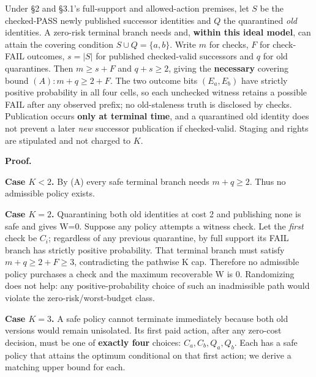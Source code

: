 \documentclass[
  10pt,
  american,
  a4paper,
]{article}
\begin{document}
Under §2 and §3.1's full-support and allowed-action premises, let \(S\)
be the checked-PASS newly published successor identities and \(Q\) the
quarantined \emph{old} identities. A zero-risk terminal branch needs
and, \textbf{within this ideal model}, can attain the covering condition
\(S\cup Q=\{a,b\}\). Write \(m\) for checks, \(F\) for check-FAIL
outcomes, \(s=|S|\) for published checked-valid successors and \(q\) for
old quarantines. Then \(m\ge s+F\) and \(q+s\ge2\), giving the
\textbf{necessary} covering bound \((A): m+q\ge2+F\). The two outcome
bits \((E_a,E_b)\) have strictly positive probability in all four cells,
so each unchecked witness retains a possible FAIL after any observed
prefix; no old-staleness truth is disclosed by checks. Publication
occurs \textbf{only at terminal time}, and a quarantined old identity
does not prevent a later \emph{new} successor publication if
checked-valid. Staging and rights are stipulated and not charged to
\(K\).

\textbf{Proof.}

\textbf{Case \(K<2\).} By (A) every safe terminal branch needs
\(m+q\ge2\). Thus no admissible policy exists.

\textbf{Case \(K=2\).} Quarantining both old identities at cost 2 and
publishing none is safe and gives W=0. Suppose any policy attempts a
witness check. Let the \emph{first} check be \(C_i\); regardless of any
previous quarantine, by full support its FAIL branch has strictly
positive probability. That terminal branch must satisfy
\(m+q\ge2+F\ge3\), contradicting the pathwise K cap. Therefore no
admissible policy purchases a check and the maximum recoverable W is 0.
Randomizing does not help: any positive-probability choice of such an
inadmissible path would violate the zero-risk/worst-budget class.

\textbf{Case \(K=3\).} A safe policy cannot terminate immediately
because both old versions would remain unisolated. Its first paid
action, after any zero-cost decision, must be one of \textbf{exactly
four} choices: \(C_a,C_b,Q_a,Q_b\). Each has a safe policy that attains
the optimum conditional on that first action; we derive a matching upper
bound for each.
\end{document}
